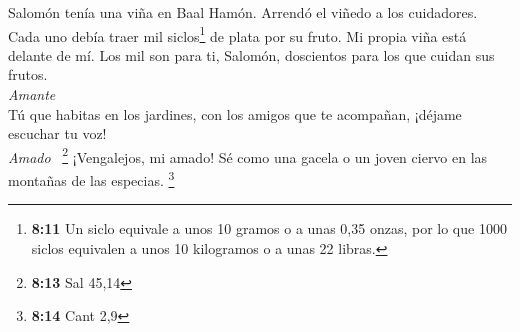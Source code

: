 Salomón tenía una viña en Baal Hamón. Arrendó el viñedo
a los cuidadores. Cada uno debía traer mil siclos\footnote{\textbf{8:11}
  Un siclo equivale a unos 10 gramos o a unas 0,35 onzas, por lo que
  1000 siclos equivalen a unos 10 kilogramos o a unas 22 libras.} de
plata por su fruto.  Mi propia viña está delante de mí.
Los mil son para ti, Salomón, doscientos para los que cuidan sus
frutos.\\
\emph{Amante}\\
 Tú que habitas en los jardines, con los amigos que te
acompañan, ¡déjame escuchar tu voz!\\
\emph{Amado} ~\footnote{\textbf{8:13} Sal 45,14} 
¡Vengalejos, mi amado! Sé como una gacela o un joven ciervo en las
montañas de las especias. \footnote{\textbf{8:14} Cant 2,9}
